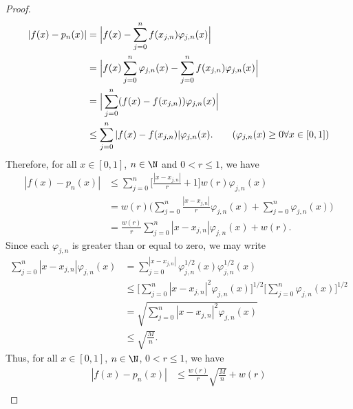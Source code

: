 \begin{proof}
\begin{align*}
        | f(x) - {p}_{n}(x)  | &= \Big| f(x) - \sum_{ j=0  }^{ n  } f({x}_{j,n}) {\varphi}_{j,n}(x)  \Big|  \\
                               &= \Big| f(x) \sum_{ j=0  }^{ n } {\varphi}_{j,n}(x) - \sum_{ j = 0  }^{ n } f({x}_{j,n}) {\varphi}_{j,n}(x)   \Big| \\
                               &= \Big| \sum_{ j= 0  }^{ n } (f(x) - f({x}_{j,n})) {\varphi}_{j,n}(x) \Big| \\
                               &\leq \sum_{ j=0  }^{ n } | f(x) - f({x}_{j,n})  | {\varphi}_{j,n}(x). \tag{\( {\varphi}_{j,n}(x) \geq 0 \forall x \in [0,1]  \)} 
    \end{align*}
    Therefore, for all \( x \in [0,1] \), \( n \in \N  \) and \( 0 < r \leq 1  \), we have 
    \begin{align*}
        | f(x) - {p}_{n}(x)  | &\leq \sum_{ j=0  }^{ n } \Big[ \frac{ | x - {x}_{j,n} |  }{ r  }  + 1 \Big] w (r) {\varphi}_{j,n}(x)  \\
                               &= w(r) \Big(  \sum_{ j=0  }^{ n } \frac{ | x - {x}_{j,n} |  }{ r  }  {\varphi}_{j,n}(x) + \sum_{ j=0  }^{ n } {\varphi}_{j,n}(x)  \Big) \\
                               &= \frac{ w(r) }{ r  }  \sum_{ j=0  }^{ n } | x- {x}_{j,n} |  {\varphi}_{j,n}(x) + w(r).
    \end{align*}
    Since each \( {\varphi}_{j,n} \) is greater than or equal to zero, we may write
    \begin{align*}
        \sum_{ j = 0   }^{ n } | x - {x}_{j,n} | {\varphi}_{j,n}(x)  &= \sum_{ j=0  }^{  | x - {x}_{j,n} |  } {\varphi}_{j,n}^{1/2}(x) {\varphi}_{j,n}^{1/2}(x)  \\
                                                                     &\leq \Big[\sum_{ j=0  }^{ n } | x - {x}_{j,n} |^{2}  {\varphi}_{j,n}(x) \Big]^{1/2} \Big[ \sum_{ j= 0  }^{ n } {\varphi}_{j,n}(x)  \Big]^{1/2} \\
                                                                     &= \sqrt{ \sum_{ j=0  }^{ n } | x - {x}_{j,n} |^{2} {\varphi}_{j,n}(x) }  \\
                                                                     &\leq \sqrt{ \frac{ M }{ n }  }.
    \end{align*}
    Thus, for all \( x \in [0,1] \), \( n \in \N  \), \( 0 < r \leq 1  \), we have 
    \begin{align*}
        | f(x) - {p}_{n}(x) | &\leq \frac{ w(r) }{ r  }  \sqrt{  \frac{ M }{ n }  }  + w(r) \\

\end{align*}
\end{proof}
